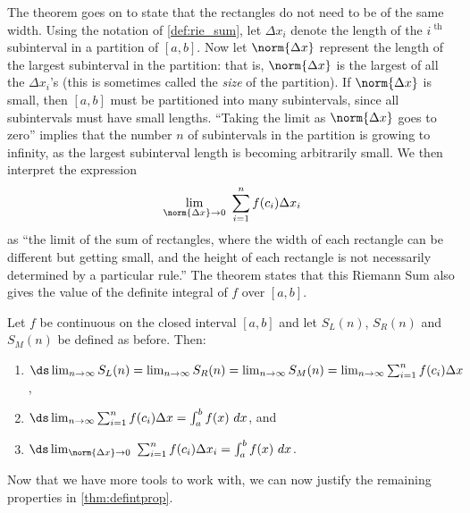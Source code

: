 The theorem goes on to state that the rectangles do not need to be of the same width. Using the notation of \autoref{def:rie_sum}, let $\Delta x_i$ denote the length of the $i^\text{ th}$ subinterval in a partition of $[a,b]$. Now let $\norm{\Delta x}$ represent the length of the largest subinterval in the partition: that is, $\norm{\Delta x}$ is the largest of all the $\Delta x_i$'s (this is sometimes called the \emph{size} of the partition). If $\norm{\Delta x}$ is small, then $[a,b]$ must be partitioned into many subintervals, since all subintervals must have small lengths. ``Taking the limit as $\norm{\Delta x}$ goes to zero'' implies that the number $n$ of subintervals in the partition is growing to infinity, as the largest subinterval length is becoming arbitrarily small. We then interpret the expression 
\[\lim_{\norm{\Delta x}\to 0}\ \sum_{i=1}^n f(c_i)\Delta x_i\]
as ``the limit of the sum of rectangles, where the width of each rectangle can be different but getting small, and the height of each rectangle is not necessarily determined by a particular rule.'' The theorem states that this Riemann Sum also gives the value of the definite integral of $f$ over $[a,b]$.

\begin{theorem}\label{thm:riemannSum}
Let $f$ be continuous on the closed interval $[a,b]$  and let $S_L(n)$, $S_R(n)$ and $S_M(n)$ be defined as before. Then:
\begin{enumerate}
	\item	$\ds \lim_{n\to\infty} S_L(n) = \lim_{n\to\infty} S_R(n) = \lim_{n\to\infty} S_M(n) = \lim_{n\to\infty}\sum_{i=1}^n f(c_i)\Delta x$, 
	\item	$\ds \lim_{n\to\infty}\sum_{i=1}^n f(c_i)\Delta x = \int_a^b f(x)\ dx$, and
	\item	$\ds \lim_{\norm{\Delta x}\to 0}\ \sum_{i=1}^n f(c_i)\Delta x_i = \int_a^b f(x)\ dx$.
\end{enumerate}
\end{theorem}

Now that we have more tools to work with, we can now justify the remaining properties in \autoref{thm:defintprop}. 

%

